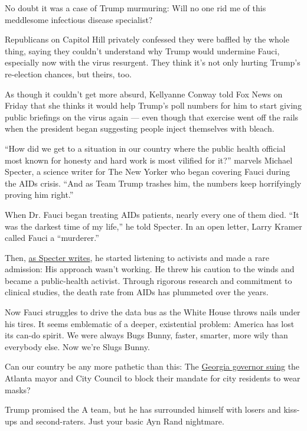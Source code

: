 No doubt it was a case of Trump murmuring: Will no one rid me of this
meddlesome infectious disease specialist?

Republicans on Capitol Hill privately confessed they were baffled by the
whole thing, saying they couldn't understand why Trump would undermine
Fauci, especially now with the virus resurgent. They think it's not only
hurting Trump's re-election chances, but theirs, too.

As though it couldn't get more absurd, Kellyanne Conway told Fox News on
Friday that she thinks it would help Trump's poll numbers for him to
start giving public briefings on the virus again --- even though that
exercise went off the rails when the president began suggesting people
inject themselves with bleach.

``How did we get to a situation in our country where the public health
official most known for honesty and hard work is most vilified for it?''
marvels Michael Specter, a science writer for The New Yorker who began
covering Fauci during the AIDs crisis. ``And as Team Trump trashes him,
the numbers keep horrifyingly proving him right.''

When Dr. Fauci began treating AIDs patients, nearly every one of them
died. ``It was the darkest time of my life,'' he told Specter. In an
open letter, Larry Kramer called Fauci a ``murderer.''

Then,
\href{https://www.newyorker.com/magazine/2020/04/20/how-anthony-fauci-became-americas-doctor}{as
Specter writes}, he started listening to activists and made a rare
admission: His approach wasn't working. He threw his caution to the
winds and became a public-health activist. Through rigorous research and
commitment to clinical studies, the death rate from AIDs has plummeted
over the years.

Now Fauci struggles to drive the data bus as the White House throws
nails under his tires. It seems emblematic of a deeper, existential
problem: America has lost its can-do spirit. We were always Bugs Bunny,
faster, smarter, more wily than everybody else. Now we're Slugs Bunny.

Can our country be any more pathetic than this: The
\href{https://www.nytimes3xbfgragh.onion/aponline/2020/07/16/us/ap-us-virus-outbreak-georgia.html}{Georgia
governor suing} the Atlanta mayor and City Council to block their
mandate for city residents to wear masks?

Trump promised the A team, but he has surrounded himself with losers and
kiss-ups and second-raters. Just your basic Ayn Rand nightmare.

